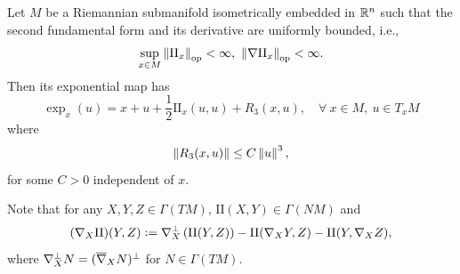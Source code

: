 \begin{lem}\label{lem:taylo_exp_bounded}
    Let $M$ be a Riemannian submanifold isometrically embedded in $\mathbb{R}^n$ such that the second fundamental form and its derivative are uniformly bounded, i.e.,
    \begin{equation*}
        \sup_{x \in M} \left\lVert\mathrm{II}_x\right\lVert_{\operatorname{op}} < \infty,~ \left\lVert\nabla\mathrm{II}_x\right\lVert_{\operatorname{op}} < \infty.
    \end{equation*}
    Then its exponential map has
    \begin{equation*}
        \exp_x(u) = x + u + \frac{1}{2}\mathrm{II}_x(u,u) + R_3(x,u),\quad \forall~ x \in M,~u \in T_xM
    \end{equation*}
    where
    \begin{equation*}
        \left\lVert R_3(x,u)\right\lVert \leq C \left\lVert u\right\lVert^3,
    \end{equation*}
    for some $C > 0$ independent of $x$.
\end{lem}
\begin{rmk}
    Note that for any $X,Y,Z \in \Gamma(TM)$, $\mathrm{II}(X,Y) \in \Gamma(NM)$ and
    \begin{equation*}
        (\nabla_X \mathrm{II})(Y,Z) \vcentcolon= \nabla_X^\perp\left(\mathrm{II}(Y,Z)\right) - \mathrm{II}(\nabla_XY,Z) - \mathrm{II}(Y,\nabla_XZ),
    \end{equation*}
    where $\nabla_X^\perp N = (\overline{\nabla}_XN)^\perp$ for $N \in \Gamma(TM)$.
\end{rmk}
